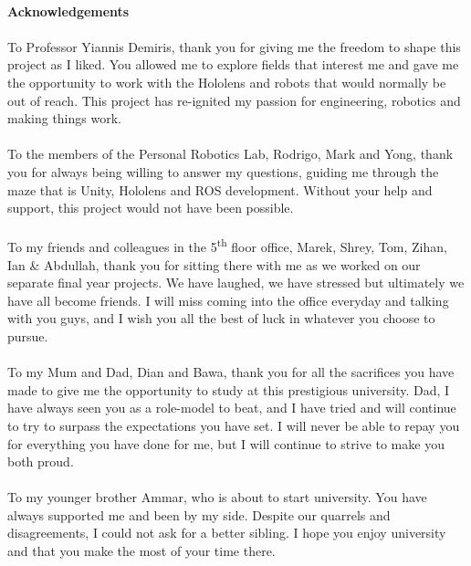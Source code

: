 \newpage

\paragraph{Acknowledgements}

\paragraph{}To Professor Yiannis Demiris, thank you for giving me the freedom to shape this project as I liked. You allowed me to explore fields that interest me and gave me the opportunity to work with the Hololens and robots that would normally be out of reach. This project has re-ignited my passion for engineering, robotics and making things work.

\paragraph{}To the members of the Personal Robotics Lab, Rodrigo, Mark and Yong, thank you for always being willing to answer my questions, guiding me through the maze that is Unity, Hololens and ROS development. Without your help and support, this project would not have been possible.

\paragraph{}To my friends and colleagues in the 5\textsuperscript{th} floor office, Marek, Shrey, Tom, Zihan, Ian \& Abdullah, thank you for sitting there with me as we worked on our separate final year projects. We have laughed, we have stressed but ultimately we have all become friends. I will miss coming into the office everyday and talking with you guys, and I wish you all the best of luck in whatever you choose to pursue.

\paragraph{}To my Mum and Dad, Dian and Bawa, thank you for all the sacrifices you have made to give me the opportunity to study at this prestigious university. Dad, I have always seen you as a role-model to beat, and I have tried and will continue to try to surpass the expectations you have set. I will never be able to repay you for everything you have done for me, but I will continue to strive to make you both proud.

\paragraph{}To my younger brother Ammar, who is about to start university. You have always supported me and been by my side. Despite our quarrels and disagreements, I could not ask for a better sibling. I hope you enjoy university and that you make the most of your time there.

